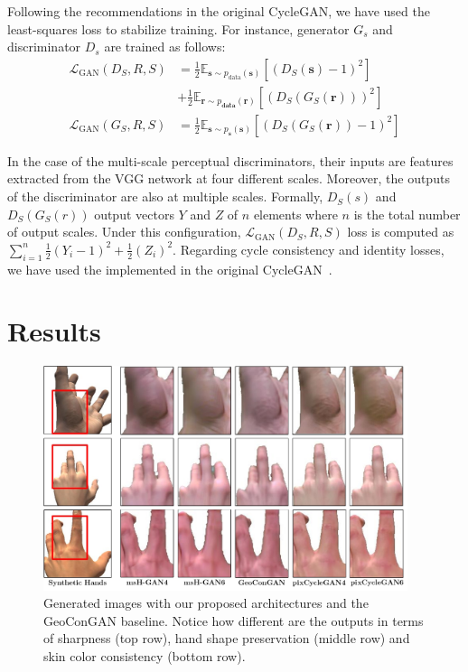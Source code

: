 Following the recommendations in the original \ac{CycleGAN}, we have used the least-squares loss\cite{Mao2017} to stabilize training. For instance, generator $G_s$ and discriminator $D_s$ are trained as follows:
\begin{equation}\begin{aligned}
\mathcal{L}_{\mathrm{GAN}}\left(D_{S}, R, S\right) &=\frac{1}{2} \mathbb{E}_{\boldsymbol{s} \sim p_{\text{data}}(\boldsymbol{s})}\left[(D_{S}(\boldsymbol{s})-1)^{2}\right] \\
&+\frac{1}{2} \mathbb{E}_{\boldsymbol{r} \sim p_{\boldsymbol{\text{data}}}(\boldsymbol{r})}\left[(D_{S}(G_{S}(\boldsymbol{r})))^{2}\right] \\
\mathcal{L}_{\mathrm{GAN}}\left(G_{S}, R, S\right)  &= \frac{1}{2}\mathbb{E}_{\boldsymbol{s} \sim p_{\boldsymbol{s}}(\boldsymbol{s})}\left[(D_{S}(G_{S}(\boldsymbol{r}))-1)^{2}\right]
\end{aligned}\end{equation}

In the case of the multi-scale perceptual discriminators, their inputs are features extracted from the VGG network at four different scales. Moreover, the outputs of the discriminator are also at multiple scales. Formally, $D_{S}(s)$ and $D_{S}(G_{S}(r))$ output vectors $Y$ and $Z$ of $n$ elements where $n$ is the total number of output scales. Under this configuration, $\mathcal{L}_{\mathrm{GAN}}\left(D_{S}, R, S\right)$ loss is computed as $\sum_{i=1}^{n}\frac{1}{2}\left(Y_{i}-1\right)^{2} + \frac{1}{2}\left(Z_{i}\right)^{2}$. Regarding cycle consistency and identity losses, we have used the implemented in the original \ac{CycleGAN}~\cite{Zhu2017}.

\section{Results}
\begin{figure}[!htb]
	\centering
	\includegraphics[width=0.95\textwidth]{figures/synthtoreal/hands_details.jpg}
	\caption{Generated images with our proposed architectures and the \ac{GeoConGAN} baseline. Notice how different are the outputs in terms of sharpness (top row), hand shape preservation (middle row) and skin color consistency (bottom row).}
	\label{fig:hand_details}
\end{figure}

